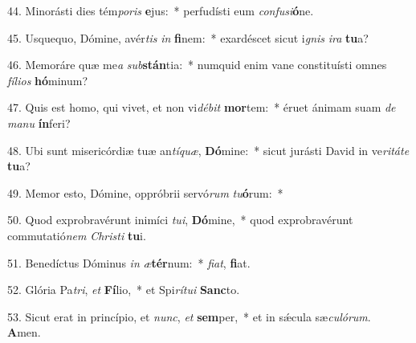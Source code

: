 44. Minorásti dies tém\textit{po}\textit{ris} \textbf{e}jus:~*  perfudísti eum \textit{con}\textit{fu}\textit{si}\textbf{ó}ne.\

45. Usquequo, Dómine, avér\textit{tis} \textit{in} \textbf{fi}nem:~*  exardéscet sicut i\textit{gnis} \textit{i}\textit{ra} \textbf{tu}a?\

46. Memoráre quæ me\textit{a} \textit{sub}\textbf{stán}tia:~*  numquid enim vane constituísti omnes \textit{fí}\textit{li}\textit{os} \textbf{hó}minum?\

47. Quis est homo, qui vivet, et non vi\textit{dé}\textit{bit} \textbf{mor}tem:~*  éruet ánimam suam \textit{de} \textit{ma}\textit{nu} \textbf{ín}feri?\

48. Ubi sunt misericórdiæ tuæ an\textit{tí}\textit{quæ}, \textbf{Dó}mine:~*  sicut jurásti David in ve\textit{ri}\textit{tá}\textit{te} \textbf{tu}a?\

49. Memor esto, Dómine, oppróbrii servó\textit{rum} \textit{tu}\textbf{ó}rum:~*  \

50. Quod exprobravérunt inimíci \textit{tu}\textit{i}, \textbf{Dó}mine,~*  quod exprobravérunt commutatió\textit{nem} \textit{Chris}\textit{ti} \textbf{tu}i.\

51. Benedíctus Dóminus \textit{in} \textit{æ}\textbf{tér}num:~*  \textit{fi}\textit{at}, \textbf{fi}at.\

52. Glória Pa\textit{tri}, \textit{et} \textbf{Fí}lio,~*  et Spi\textit{rí}\textit{tu}\textit{i} \textbf{Sanc}to.\

53. Sicut erat in princípio, et \textit{nunc}, \textit{et} \textbf{sem}per,~*  et in sǽcula sæ\textit{cu}\textit{ló}\textit{rum}. \textbf{A}men.\

